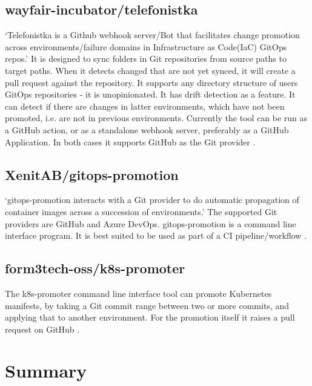 \subsection*{wayfair-incubator/telefonistka}

\enquote*{Telefonistka is a Github webhook server/Bot that facilitates change promotion across environments/failure domains in Infrastructure as Code(IaC) GitOps repos.}
\autocite{telefonistka}
It is designed to sync folders in Git repositories from source paths to target paths.
When it detects changed that are not yet synced,
it will create a pull request against the repository.
It supports any directory structure of users GitOps repositories -
it is unopinionated.
It has drift detection as a feature. It can detect if there are changes in
latter environments, which have not been promoted, i.e. are not in previous environments.
Currently the tool can be run as a GitHub action, or as a
standalone webhook server, preferably as a GitHub Application.
In both cases it supports GitHub as the Git provider
\autocite{telefonistka}.

\subsection*{XenitAB/gitops-promotion}

\enquote*{gitops-promotion interacts with a Git provider to do automatic propagation of container images across a succession of environments.}
\autocite{xenitABgitopsPromotion}
The supported Git providers are GitHub and Azure DevOps.
gitops-promotion is a command line interface program.
It is best suited to be used as part of a CI pipeline/workflow
\autocite{xenitABgitopsPromotion}.

\subsection*{form3tech-oss/k8s-promoter}

The k8s-promoter command line interface tool can promote Kubernetes manifests, by
taking a Git commit range between two or more commits, and applying that to another environment.
For the promotion itself it raises a pull request on GitHub
\autocite{form3techK8sPromoter}.

\section*{Summary}


